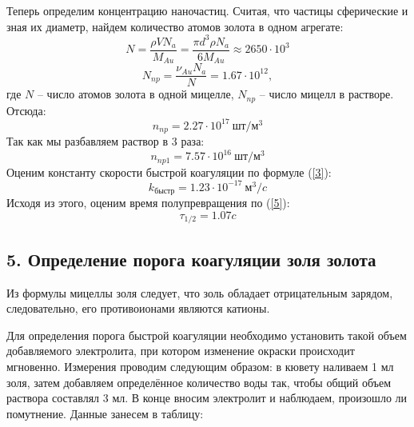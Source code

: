 \documentclass[a4paper,12pt]{article}
\begin{document}
Теперь определим концентрацию наночастиц. Считая, что частицы сферические и зная их диаметр, найдем количество атомов золота в одном агрегате:
\begin{equation*}
   N = \frac{\rho V N_a}{M_{Au}} = \frac{\pi d^3\rho N_a }{6M_{Au}} \approx 2650\cdot10^3
\end{equation*}
\begin{equation*}
    N_{np} = \frac{\nu_{Au}N_a}{N} = 1.67\cdot10^{12},
\end{equation*}
где $N$ -- число атомов золота в одной мицелле, $N_{np}$ -- число мицелл в растворе. Отсюда:
\begin{equation*}
    n_{np} = 2.27\cdot10^{17}~шт/м^3
\end{equation*}
Так как мы разбавляем раствор в 3 раза:
\begin{equation*}
    n_{np1} =7.57\cdot10^{16}~шт/м^3
\end{equation*}
Оценим константу скорости быстрой коагуляции по формуле (\ref{3}):
\begin{equation*}
    k_{быстр} = 1.23\cdot10^{-17}~м^3/c
\end{equation*}
Исходя из этого, оценим время полупревращения по (\ref{5}):
\begin{equation*}
    \tau_{1/2} = 1.07c
\end{equation*}

\subsection*{5.  Определение порога коагуляции золя золота}
Из формулы мицеллы золя следует, что золь обладает отрицательным зарядом, следовательно, его противоионами являются катионы.  

Для определения порога быстрой коагуляции необходимо установить такой объем добавляемого электролита, при котором изменение окраски происходит мгновенно. Измерения проводим следующим образом: в кювету наливаем 1 мл золя, затем добавляем определённое количество воды так, чтобы общий объем раствора составлял 3 мл. В конце вносим электролит и наблюдаем, произошло ли помутнение. Данные занесем в таблицу:
\end{document}
